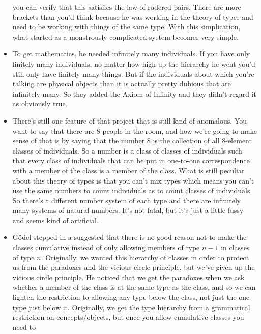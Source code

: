 \documentclass[12pt]{article}
\theoremstyle{definition}
\begin{document}
\begin{itemize}
        you can verify that this satisfies the law of rodered pairs. There are
        more brackets than you'd think because he was working in the theory of
        types and need to be working with things of the same type. With this
        simplication, what started as a monstrously complicated system becomes
        very simple.
    \item
        To get mathematics, he needed infinitely many individuals. If you have
        only finitely many individuals, no matter how high up the hierarchy he
        went you'd still only have finitely many things. But if the individuals
        about which you're talking are physical objects than it is actually
        pretty dubious that are infinitely many. So they added the Axiom of
        Infinity and they didn't regard it as obviously true.
    \item
        There's still one feature of that project that is still kind of
        anomalous. You want to say that there are 8 people in the room, and how
        we're going to make sense of that is by saying that the number 8 is the
        collection of all 8-element classes of individuals. So a number is a
        class of classes of individuals such that every class of individuals
        that can be put in one-to-one correspondence with a member of the class
        is a member of the class. What is still peculiar about this theory of
        types is that you can't mix types which means you can't use the same
        numbers to count individuals as to count classes of individuals. So
        there's a different number system of each type and there are infinitely
        many systems of natural numbers. It's not fatal, but it's just a little
        fussy and seems kind of artificial. 
    \item
        G\"odel stepped in a suggested that there is no good reason not to make
        the classes cumulative instead of only allowing members of type $n - 1$
        in classes of type $n$. Originally, we wanted this hierarchy of classes
        in order to protect us from the paradoxes and the vicious circle
        principle, but we've given up the vicious circle principle. He noticed
        that we get the paradoxes when we ask whether a member of the class is
        at the same type as the class, and so we can lighten the restriction to
        allowing any type below the class, not just the one type just below it.
        Originally, we get the type hierarchy from a grammatical restriction on
        concepts/objects, but once you allow cumulative classes you need to

\end{itemize}
\end{document}

